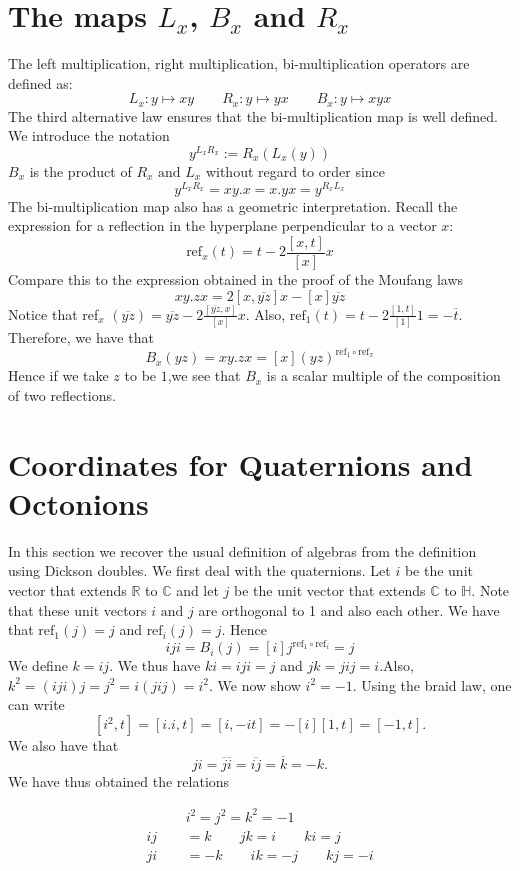 \documentclass[11pt]{report}
\theoremstyle{plain}
\theoremstyle{definition}
\begin{document}
\section{The maps $ L_x $, $ B_x$ and $ R_x $}
The left multiplication, right multiplication, bi-multiplication operators are  defined as:
$$ L_x: y \mapsto xy \qquad R_x: y\mapsto yx \qquad B_x: y \mapsto xyx $$
The third alternative law ensures that the bi-multiplication map is well defined. 
We introduce the notation $$ y^{L_x R_x} := R_x (L_x (y)) $$
$ B_x $ is the product of $ R_x \text{ and } L_x $ without regard to order since 
		$$ y^{L_x R_x} = xy.x = x.yx = y^{R_x L_x} $$
The bi-multiplication map also has a geometric interpretation. Recall the expression for a reflection in the hyperplane perpendicular to a vector $ x $:
$$\text{ref}_x(t) = t - 2\frac{[x,t]}{[x]}x $$ 
Compare this to the expression obtained in the proof of the Moufang laws 
$$xy.zx = 2[x,\overline{yz}]x - [x]\overline{yz} $$
Notice that ref$ _x $ $(\overline{yz} )  = \overline{yz}- 2\frac{[\overline{yz},x]}{[x]}x $. Also,
$ \text{ref}_1(t) = t - 2 \frac{[1,t]}{[1]}1  = -\overline{t}$. Therefore, we have that 
				$$B_x(yz) = xy.zx  = [x](yz)^{\text{ref}_1 \circ \text{ref}_x}$$
	Hence if we take $ z $ to be $ 1 $,we see that $ B_x $ is a scalar multiple of the composition of two reflections.
\section{Coordinates for Quaternions and Octonions}
In this section we recover the usual definition of algebras from the definition using Dickson doubles. We first deal with the quaternions. Let $ i $	be the unit vector that extends $ \mathbb{R} $ to $ \mathbb{C} $ and let $ j $ be the unit vector that extends $ \mathbb{C} \text{ to }\mathbb{H}. $ Note that these unit vectors $ i  \text{ and } j $ are orthogonal to 1 and also each other. We have that $ \text{ref}_1(j) = j $ and $ \text{ref}_i(j) = j $. Hence  $$ iji = B_i(j) = [i]j^{\text{ref}_1 \circ \text{ref}_i} = j$$ We define $ k = ij $.  We thus have $  ki = iji = j $ and $ jk = jij = i.$Also, $ k^2 = (iji)j = j^2 = i(jij) = i^2 $.
We now show $ i^2 = -1 $. Using the braid law, one can write $$[i^2,t] =[i.i,t] = [i,-it] = -[i][1,t] = [-1,t]. $$ We also have that $$ ji = \overline{j}\overline{i} = \overline{ij} = \overline{k} = -k. $$ We have thus obtained the relations 
	
\begin{align*}
		 \qquad &i^2 =j ^2 = k^2 =-1 \\
	        ij &=k \qquad jk =i \qquad ki =j\\
	        ji &= -k \qquad ik = -j \qquad kj = -i 
\end{align*}	
\end{document}
